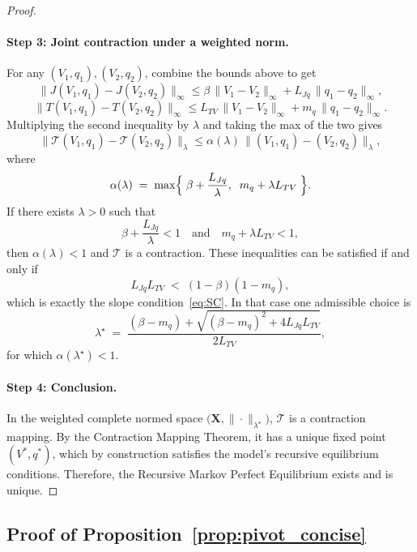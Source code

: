 \documentclass[12pt]{article}
\theoremstyle{plain}
\begin{document}
\begin{proof}
	\paragraph{Step 3: Joint contraction under a weighted norm.}
	For any $(V_1,q_1),(V_2,q_2)$, combine the bounds above to get
	\[
		\|J(V_1,q_1)-J(V_2,q_2)\|_\infty
		\le \beta\,\|V_1-V_2\|_\infty + L_{Jq}\,\|q_1-q_2\|_\infty,
	\]
	\[
		\|T(V_1,q_1)-T(V_2,q_2)\|_\infty
		\le L_{TV}\,\|V_1-V_2\|_\infty + m_q\,\|q_1-q_2\|_\infty.
	\]
	Multiplying the second inequality by $\lambda$ and taking the max of the two
	gives
	\[
		\|\mathcal T(V_1,q_1)-\mathcal T(V_2,q_2)\|_\lambda
		\le \alpha(\lambda)\,\|(V_1,q_1)-(V_2,q_2)\|_\lambda,
	\]
	where
	\[
		\alpha(\lambda)\;=\;\max\Bigl\{\;\beta+\frac{L_{Jq}}{\lambda},\;\; m_q+\lambda L_{TV}\;\Bigr\}.
	\]
	If there exists $\lambda>0$ such that
	\[
		\beta+\frac{L_{Jq}}{\lambda}<1
		\quad\text{and}\quad
		m_q+\lambda L_{TV}<1,
	\]
	then $\alpha(\lambda)<1$ and $\mathcal T$ is a contraction. These inequalities
	can be satisfied if and only if
	\[
		L_{Jq}L_{TV} \;<\; (1-\beta)(1-m_q),
	\]
	which is exactly the slope condition~\eqref{eq:SC}. In that case one admissible
	choice is
	\[
		\lambda^\star \;=\; \frac{(\beta-m_q) + \sqrt{(\beta-m_q)^2+4L_{Jq}L_{TV}}}{2L_{TV}},
	\]
	for which $\alpha(\lambda^\star)<1$.

	\paragraph{Step 4: Conclusion.}
	In the weighted complete normed space $\bigl(\mathbf
		X,\|\cdot\|_{\lambda^\star}\bigr)$, $\mathcal T$ is a contraction mapping. By
	the Contraction Mapping Theorem, it has a unique fixed point $(V^\ast,q^\ast)$,
	which by construction satisfies the model’s recursive equilibrium conditions.
	Therefore, the Recursive Markov Perfect Equilibrium exists and is unique.
\end{proof}

\subsection{Proof of Proposition~\ref{prop:pivot_concise}}\label{app:proof_pivot_concise}
\end{document}
